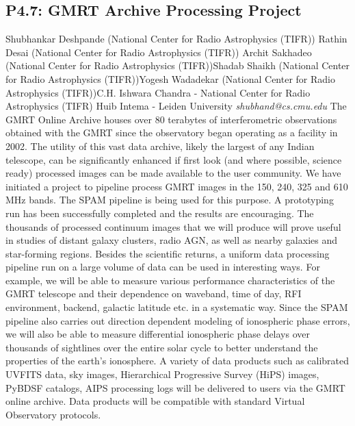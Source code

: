 \documentclass{report}
\begin{document}
\subsection*{P4.7: GMRT Archive Processing Project}
\bigskip
Shubhankar Deshpande (National Center for Radio Astrophysics (TIFR)) \newline Rathin Desai (National Center for Radio Astrophysics (TIFR)) \newline  Archit Sakhadeo (National Center for Radio Astrophysics (TIFR))\newline  Shadab Shaikh (National Center for Radio Astrophysics (TIFR))\newline Yogesh Wadadekar (National Center for Radio Astrophysics (TIFR))\newline  C.H. Ishwara Chandra - National Center for Radio Astrophysics (TIFR)
Huib Intema - Leiden University\newline\newline
{\it shubhand@cs.cmu.edu}\newline
\newline\newline
The GMRT Online Archive houses over 80 terabytes of interferometric observations obtained with the GMRT since the observatory began operating as a facility in 2002. The utility of this vast data archive, likely the largest of any Indian telescope, can be significantly enhanced if first look (and where possible, science ready) processed images can be made available to the user community. We have initiated a project to pipeline process GMRT images in the 150, 240, 325 and 610 MHz bands. The SPAM pipeline is being used for this purpose. A prototyping run has been successfully completed and the results are encouraging. The thousands of processed continuum images that we will produce will prove useful in studies of distant galaxy clusters, radio AGN, as well as nearby galaxies and star-forming regions. Besides the scientific returns, a uniform data processing pipeline run on a large volume of data can be used in
interesting ways. For example, we will be able to measure various performance characteristics of the GMRT telescope and their dependence on waveband, time of day, RFI environment,
backend, galactic latitude etc. in a systematic way. Since the SPAM pipeline also carries out direction dependent modeling of ionospheric phase errors, we will also be able to measure
differential ionospheric phase delays over thousands of sightlines over the entire solar cycle to better understand the properties of the earth's ionosphere. A variety of data products such as
calibrated UVFITS data, sky images, Hierarchical Progressive Survey (HiPS) images, PyBDSF catalogs, AIPS processing logs will be delivered to users via the GMRT online archive. Data products will be compatible with standard Virtual Observatory protocols.\newline
\newpage
\end{document}
